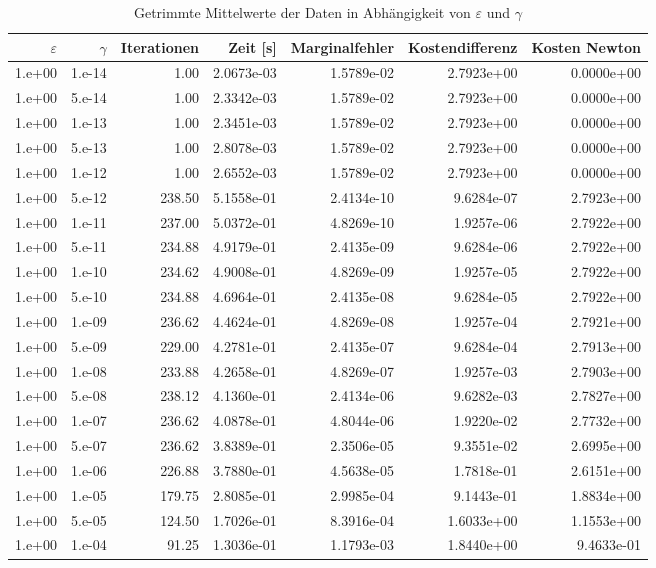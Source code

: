 \begin{table}[htbp]
\caption{Getrimmte Mittelwerte der Daten in Abhängigkeit von $\varepsilon$ und $\gamma$}
\label{tab:Parametertest128}
\small
\centering
{}
\begin{tabular}{rrrrrrr}
\toprule
$\varepsilon$ & $\gamma$ & Iterationen & Zeit [s] & Marginalfehler & Kostendifferenz & Kosten Newton \\
\midrule
1.e+00 & 1.e-14 & 1.00 & 2.0673e-03 & 1.5789e-02 & 2.7923e+00 & 0.0000e+00 \\
1.e+00 & 5.e-14 & 1.00 & 2.3342e-03 & 1.5789e-02 & 2.7923e+00 & 0.0000e+00 \\
1.e+00 & 1.e-13 & 1.00 & 2.3451e-03 & 1.5789e-02 & 2.7923e+00 & 0.0000e+00 \\
1.e+00 & 5.e-13 & 1.00 & 2.8078e-03 & 1.5789e-02 & 2.7923e+00 & 0.0000e+00 \\
1.e+00 & 1.e-12 & 1.00 & 2.6552e-03 & 1.5789e-02 & 2.7923e+00 & 0.0000e+00 \\
1.e+00 & 5.e-12 & 238.50 & 5.1558e-01 & 2.4134e-10 & 9.6284e-07 & 2.7923e+00 \\
1.e+00 & 1.e-11 & 237.00 & 5.0372e-01 & 4.8269e-10 & 1.9257e-06 & 2.7922e+00 \\
1.e+00 & 5.e-11 & 234.88 & 4.9179e-01 & 2.4135e-09 & 9.6284e-06 & 2.7922e+00 \\
1.e+00 & 1.e-10 & 234.62 & 4.9008e-01 & 4.8269e-09 & 1.9257e-05 & 2.7922e+00 \\
1.e+00 & 5.e-10 & 234.88 & 4.6964e-01 & 2.4135e-08 & 9.6284e-05 & 2.7922e+00 \\
1.e+00 & 1.e-09 & 236.62 & 4.4624e-01 & 4.8269e-08 & 1.9257e-04 & 2.7921e+00 \\
1.e+00 & 5.e-09 & 229.00 & 4.2781e-01 & 2.4135e-07 & 9.6284e-04 & 2.7913e+00 \\
1.e+00 & 1.e-08 & 233.88 & 4.2658e-01 & 4.8269e-07 & 1.9257e-03 & 2.7903e+00 \\
1.e+00 & 5.e-08 & 238.12 & 4.1360e-01 & 2.4134e-06 & 9.6282e-03 & 2.7827e+00 \\
1.e+00 & 1.e-07 & 236.62 & 4.0878e-01 & 4.8044e-06 & 1.9220e-02 & 2.7732e+00 \\
1.e+00 & 5.e-07 & 236.62 & 3.8389e-01 & 2.3506e-05 & 9.3551e-02 & 2.6995e+00 \\
1.e+00 & 1.e-06 & 226.88 & 3.7880e-01 & 4.5638e-05 & 1.7818e-01 & 2.6151e+00 \\
1.e+00 & 1.e-05 & 179.75 & 2.8085e-01 & 2.9985e-04 & 9.1443e-01 & 1.8834e+00 \\
1.e+00 & 5.e-05 & 124.50 & 1.7026e-01 & 8.3916e-04 & 1.6033e+00 & 1.1553e+00 \\
1.e+00 & 1.e-04 & 91.25 & 1.3036e-01 & 1.1793e-03 & 1.8440e+00 & 9.4633e-01 \\
\bottomrule
\end{tabular}
\end{table}
